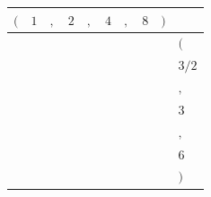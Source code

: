 {\scriptsize\setlength{\tabcolsep}{1.5pt}%
\begin{tabular}{ccccccccc|l}
$($ & $\text{1}$ & $,$ & $\text{2}$ & $,$ & $\text{4}$ & $,$ & $\text{8}$ & $)$ & \\ \hline
\gcell{$$} & \gcell{$$} & \gcell{$$} & \gcell{$$} & \gcell{$$} & \gcell{$$} & \gcell{$$} & \gcell{$$} & \gcell{$$} & $($ \\
\gcell{$$} & \gcell{$\posD{\bullet}$} & \gcell{$\posC{\circ}$} & \gcell{$\posD{\bullet}$} & \gcell{$\posC{\circ}$} & \gcell{$$} & \gcell{$$} & \gcell{$$} & \gcell{$$} & $\text{3/2}$ \\
\gcell{$$} & \gcell{$$} & \gcell{$$} & \gcell{$$} & \gcell{$$} & \gcell{$$} & \gcell{$$} & \gcell{$$} & \gcell{$$} & $,$ \\
\gcell{$$} & \gcell{$$} & \gcell{$\posC{\circ}$} & \gcell{$\posD{\bullet}$} & \gcell{$\posC{\circ}$} & \gcell{$\posD{\bullet}$} & \gcell{$\posC{\circ}$} & \gcell{$$} & \gcell{$$} & $\text{3}$ \\
\gcell{$$} & \gcell{$$} & \gcell{$$} & \gcell{$$} & \gcell{$$} & \gcell{$$} & \gcell{$$} & \gcell{$$} & \gcell{$$} & $,$ \\
\gcell{$$} & \gcell{$$} & \gcell{$\posC{\circ}$} & \gcell{$$} & \gcell{$\posC{\circ}$} & \gcell{$\posD{\bullet}$} & \gcell{$\posC{\circ}$} & \gcell{$\posD{\bullet}$} & \gcell{$$} & $\text{6}$ \\
\gcell{$$} & \gcell{$$} & \gcell{$$} & \gcell{$$} & \gcell{$$} & \gcell{$$} & \gcell{$$} & \gcell{$$} & \gcell{$$} & $)$ \\
\end{tabular}}
